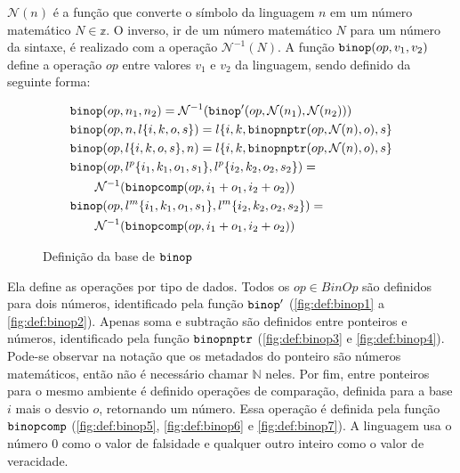 $\mathcal{N}(n)$ é a função que converte o símbolo da linguagem $n$ em um número matemático $N \in \mathbb{z}$. O inverso, ir de um número matemático $N$ para um número da sintaxe, é realizado com a operação $\mathcal{N}^{-1}(N)$. A função $\texttt{binop}(op, v_1, v_2)$ define a operação $op$ entre valores $v_1$ e $v_2$ da linguagem, sendo definido da seguinte forma:

\begin{figure}[ht]
	\begin{align}
		& \texttt{binop}(op, n_1, n_2) = \mathcal{N}^{-1}(\texttt{binop}'(op, \mathcal{N}(n_1), \mathcal{N}(n_2))) \\
		& \texttt{binop}(op, n, l\{i, k, o, s\}) = l\{i, k, \texttt{binopnptr}(op, \mathcal{N}(n), o), s\} \\
		& \texttt{binop}(op, l\{i, k, o, s\}, n) = l\{i, k, \texttt{binopnptr}(op, \mathcal{N}(n), o), s\} \\
		& \texttt{binop}(op, l^p\{i_1, k_1, o_1, s_1\}, l^p\{i_2, k_2, o_2, s_2\}) = \nonumber \\ 
		&\quad\quad\mathcal{N}^{-1}(\texttt{binopcomp}(op, i_1 + o_1, i_2 + o_2)) \\
		& \texttt{binop}(op, l^m\{i_1, k_1, o_1, s_1\}, l^m\{i_2, k_2, o_2, s_2\}) = \nonumber \\ 
		&\quad\quad\mathcal{N}^{-1}(\texttt{binopcomp}(op, i_1 + o_1, i_2 + o_2)) 
	\end{align}
	\caption{Definição da base de $\texttt{binop}$}
	\label{fig:def:binop:base}
\end{figure}

Ela define as operações por tipo de dados. Todos os $op \in BinOp$ são definidos para dois números, identificado pela função $\texttt{binop}'$ (\ref{fig:def:binop1} a \ref{fig:def:binop2}). Apenas soma e subtração são definidos entre ponteiros e números, identificado pela função $\texttt{binopnptr}$ (\ref{fig:def:binop3} e \ref{fig:def:binop4}). Pode-se observar na notação que os metadados do ponteiro são números matemáticos, então não é necessário chamar $\mathbb{N}$ neles. Por fim, entre ponteiros para o mesmo ambiente é definido operações de comparação, definida para a base $i$ mais o desvio $o$, retornando um número. Essa operação é definida pela função $\texttt{binopcomp}$ (\ref{fig:def:binop5}, \ref{fig:def:binop6} e \ref{fig:def:binop7}). A linguagem usa o número 0 como o valor de falsidade e qualquer outro inteiro como o valor de veracidade.

